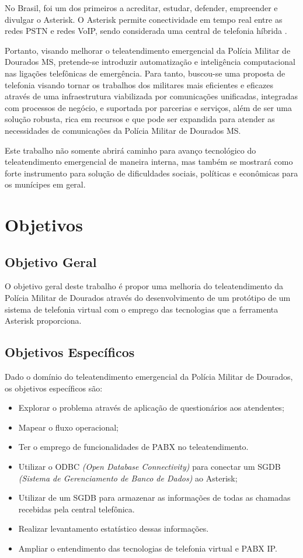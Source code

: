 No Brasil,  foi um dos primeiros a acreditar, estudar, defender, empreender e divulgar o Asterisk. O Asterisk permite conectividade em tempo real entre as redes PSTN e redes VoIP, sendo considerada uma central de telefonia híbrida \cite{alexandrekeller2014}.

Portanto, visando melhorar o teleatendimento emergencial da Polícia Militar de Dourados MS, pretende-se introduzir automatização e inteligência computacional nas ligações telefônicas de emergência. Para tanto, buscou-se uma proposta de telefonia visando tornar os trabalhos dos militares mais eficientes e eficazes através de uma infraestrutura viabilizada por comunicações unificadas, integradas com processos de negócio, e suportada por parcerias e serviços, além de ser uma solução robusta, rica em recursos e que pode ser expandida para atender as necessidades de comunicações da Polícia Militar de Dourados MS.

Este trabalho não somente abrirá caminho para avanço tecnológico do teleatendimento emergencial de maneira interna, mas também se mostrará como forte instrumento para solução de dificuldades sociais, políticas e econômicas para os munícipes em geral.

\section{Objetivos}
\subsection{Objetivo Geral}
O objetivo geral deste trabalho é propor uma melhoria do teleatendimento da Polícia Militar de Dourados através do desenvolvimento de um protótipo de um sistema de telefonia virtual com o emprego das tecnologias que a ferramenta Asterisk proporciona.

\subsection{Objetivos Específicos}
Dado o domínio do teleatendimento emergencial da Polícia Militar de Dourados, os objetivos específicos são:

\begin{itemize}
	\item Explorar o problema através de aplicação de questionários aos atendentes;
	\item Mapear o fluxo operacional;
	\item Ter o emprego de funcionalidades de PABX no teleatendimento.
	\item Utilizar o ODBC \textit{(Open Database Connectivity)} para conectar um SGDB \textit{(Sistema de Gerenciamento de Banco de Dados)} ao Asterisk;
	\item Utilizar de um SGDB para armazenar as informações de todas as chamadas recebidas pela central telefônica.
	\item Realizar levantamento estatístico dessas informações.
	\item Ampliar o entendimento das tecnologias de telefonia virtual e PABX IP.
\end{itemize}

